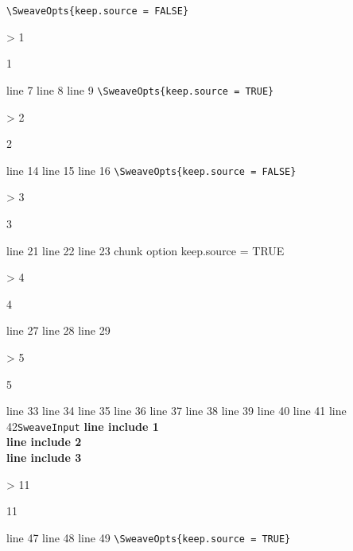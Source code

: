 \documentclass[english, a4paper, 10pt, headings=small, DIV11]{scrartcl}
\begin{document}
\verb+\SweaveOpts{keep.source = FALSE}+
\begin{Schunk}
\begin{Sinput}
> 1
\end{Sinput}
\begin{Soutput}
[1] 1
\end{Soutput}
\end{Schunk}
line 7 
line 8 
line 9 
\verb+\SweaveOpts{keep.source = TRUE}+
\begin{Schunk}
\begin{Sinput}
> 2
\end{Sinput}
\begin{Soutput}
[1] 2
\end{Soutput}
\end{Schunk}
line 14 
line 15 
line 16  
\verb+\SweaveOpts{keep.source = FALSE}+
\begin{Schunk}
\begin{Sinput}
> 3
\end{Sinput}
\begin{Soutput}
[1] 3
\end{Soutput}
\end{Schunk}
line 21 
line 22
line 23 chunk option keep.source = TRUE
\begin{Schunk}
\begin{Sinput}
> 4
\end{Sinput}
\begin{Soutput}
[1] 4
\end{Soutput}
\end{Schunk}
line 27
line 28
line 29
\begin{Schunk}
\begin{Sinput}
> 5
\end{Sinput}
\begin{Soutput}
[1] 5
\end{Soutput}
\end{Schunk}
line 33
line 34
line 35
line 36
line 37
line 38
line 39
line 40
line 41
line 42\verb+SweaveInput+
\textbf{line include 1}\\
\textbf{line include 2}\\
\textbf{line include 3}\\
\begin{Schunk}
\begin{Sinput}
> 11
\end{Sinput}
\begin{Soutput}
[1] 11
\end{Soutput}
\end{Schunk}
line 47 
line 48 
line 49 
\verb+\SweaveOpts{keep.source = TRUE}+
\end{document}
